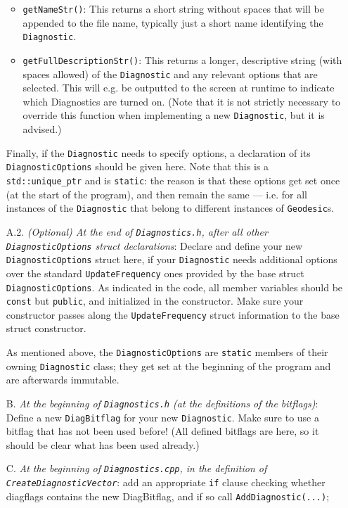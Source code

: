\documentclass[11pt,a4paper]{article}
\newcommand{\code}[1]{{\tt #1}}
\begin{document}
\begin{itemize}
\begin{itemize}
 \item \code{getNameStr()}: This returns a short string without spaces that will be appended to the file name, typically just a short name identifying the \code{Diagnostic}.
 \item \code{getFullDescriptionStr()}: This returns a longer, descriptive string (with spaces allowed) of the \code{Diagnostic} and any relevant options that are selected. This will e.g. be outputted to the screen at runtime to indicate which Diagnostics are turned on. (Note that it is not strictly necessary to override this function when implementing a new \code{Diagnostic}, but it is advised.)
 \end{itemize}
 Finally, if the \code{Diagnostic} needs to specify options, a declaration of its \code{DiagnosticOptions} should be given here. Note that this is a \code{std::unique\_ptr} and is \code{static}: the reason is that these options get set once (at the start of the program), and then remain the same --- i.e. for all instances of the \code{Diagnostic} that belong to different instances of \code{Geodesic}s.
 
 \item[A.2.] \emph{(Optional) At the end of \code{Diagnostics.h}, after all other \code{DiagnosticOptions} struct declarations}: Declare and define your new \code{DiagnosticOptions} struct here, if your \code{Diagnostic} needs additional options over the standard \code{UpdateFrequency} ones provided by the base struct \code{DiagnosticOptions}. As indicated in the code, all member variables should be \code{const} but \code{public}, and initialized in the constructor. Make sure your constructor passes along the \code{UpdateFrequency} struct information to the base struct constructor.
 
 As mentioned above, the \code{DiagnosticOptions} are \code{static} members of their owning \code{Diagnostic} class; they get set at the beginning of the program and are afterwards immutable.
 
 \item[B.] \emph{At the beginning of \code{Diagnostics.h} (at the definitions of the bitflags)}: Define a new \code{DiagBitflag} for your new \code{Diagnostic}. Make sure to use a bitflag that has not been used before! (All defined bitflags are here, so it should be clear what has been used already.) 
 
 \item[C.] \emph{At the beginning of \code{Diagnostics.cpp}, in the definition of \code{CreateDiagnosticVector}}: add an appropriate \code{if} clause checking whether diagflags contains the new DiagBitflag, and if so call \code{AddDiagnostic(...)};
 

\end{itemize}
\end{document}
